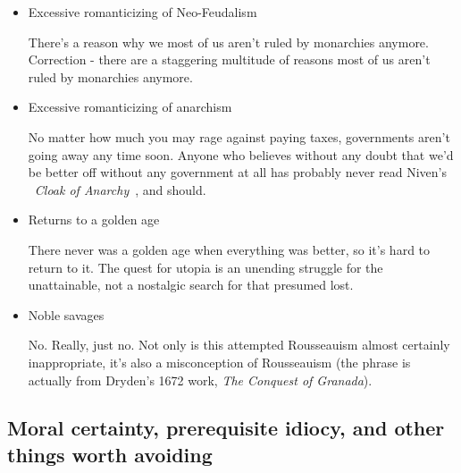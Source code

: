 \begin{itemize}
\begin{itemize}
\item Excessive romanticizing of Neo-Feudalism

There's a reason why we most of us aren't ruled by monarchies
anymore. Correction - there are a staggering multitude of reasons most
of us aren't ruled by monarchies anymore.

\item Excessive romanticizing of anarchism

No matter how much you may rage against paying taxes, governments
aren't going away any time soon. Anyone who believes without any doubt
that we'd be better off without any government at all has probably
never read Niven's ~\emph{Cloak of
Anarchy}~\cite{PurpleRobeofAnarchy}, and should.

\item Returns to a golden age

There never was a golden age when everything was better, so it's hard
to return to it. The quest for utopia is an unending struggle for the
unattainable, not a nostalgic search for that presumed lost.

\item Noble savages

No. Really, just no. Not only is this attempted Rousseauism almost
certainly inappropriate, it's also a misconception of Rousseauism (the
phrase is actually from Dryden's 1672 work, \emph{The Conquest of
Granada}).

\end{itemize}

\end{itemize}

\subsection{Moral certainty, prerequisite idiocy, and other things worth avoiding} 

